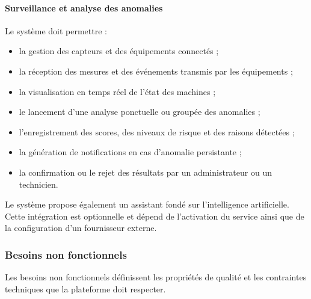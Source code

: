 \paragraph{Surveillance et analyse des anomalies}

Le système doit permettre :

\begin{itemize}
    \item la gestion des capteurs et des équipements connectés ;
    \item la réception des mesures et des événements transmis par les équipements ;
    \item la visualisation en temps réel de l’état des machines ;
    \item le lancement d’une analyse ponctuelle ou groupée des anomalies ;
    \item l’enregistrement des scores, des niveaux de risque et des raisons détectées ;
    \item la génération de notifications en cas d’anomalie persistante ;
    \item la confirmation ou le rejet des résultats par un administrateur ou un technicien.
\end{itemize}

Le système propose également un assistant fondé sur l’intelligence artificielle. Cette intégration est optionnelle et dépend de l’activation du service ainsi que de la configuration d’un fournisseur externe.


\subsubsection{Besoins non fonctionnels}

Les besoins non fonctionnels définissent les propriétés de qualité et les contraintes techniques que la plateforme doit respecter.

